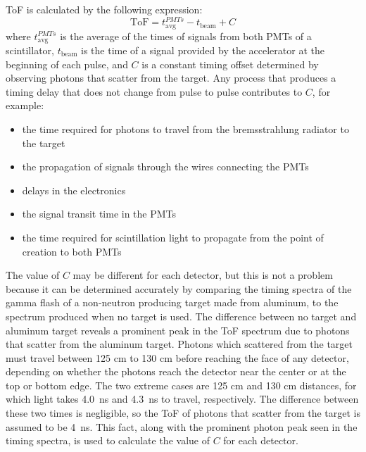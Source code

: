 ToF is calculated by the following expression:
\begin{displaymath}
\text{ToF} = t^{PMTs}_{\text{avg}} - t_{\text{beam}} + C
\end{displaymath}
where $t^{PMTs}_{\text{avg}}$ is the average of the times of signals from both PMTs of a scintillator, $t_{\text{beam}}$ is the time of a signal provided by the accelerator at the beginning of each pulse, and $C$ is a constant timing offset determined by observing photons that scatter from the target.
Any process that produces a timing delay that does not change from pulse to pulse contributes to $C$, for example: \begin{itemize}
\item the time required for photons to travel from the bremsstrahlung radiator to the target
\item the propagation of signals through the wires connecting the PMTs
\item delays in the electronics
\item the signal transit time in the PMTs
\item the time required for scintillation light to propagate from the point of creation to both PMTs
\end{itemize}

The value of $C$ may be different for each detector, but this is not a problem because it can be determined accurately by comparing the timing spectra of the gamma flash of a non-neutron producing target made from aluminum, to the spectrum produced when no target is used.
The difference between no target and aluminum target reveals a prominent peak in the ToF spectrum due to photons that scatter from the aluminum target.
Photons which scattered from the target must travel between 125 cm to 130 cm before reaching the face of any detector, depending on whether the photons reach the detector near the center or at the top or bottom edge.
The two extreme cases are 125 cm and 130 cm distances, for which light takes 4.0~ns and 4.3~ns to travel, respectively.
The difference between these two times is negligible, so the ToF of photons that scatter from the target is assumed to be 4~ns.
This fact, along with the prominent photon peak seen in the timing spectra, is used to calculate the value of $C$ for each detector.

